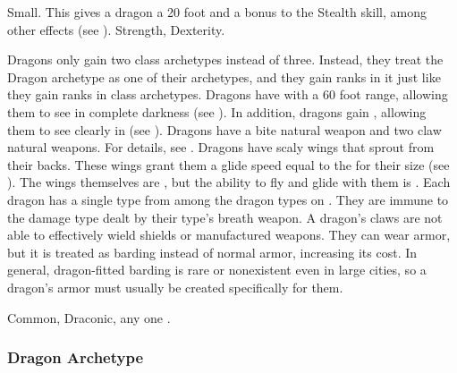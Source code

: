          Small. This gives a dragon a 20 foot  and a  bonus to the Stealth skill, among other effects (see ).
          Strength,  Dexterity.
        \begin{itemize}
             Dragons only gain two class archetypes instead of three.
                Instead, they treat the Dragon archetype as one of their archetypes, and they gain ranks in it just like they gain ranks in class archetypes.
             Dragons have  with a 60 foot range, allowing them to see in complete darkness (see ).
                In addition, dragons gain , allowing them to see clearly in  (see ).
             Dragons have a bite natural weapon and two claw natural weapons.
                For details, see .
             Dragons have scaly wings that sprout from their backs.
                These wings grant them a glide speed equal to the  for their size (see ).
                The wings themselves are , but the ability to fly and glide with them is .
             Each dragon has a single type from among the dragon types on .
                They are immune to the damage type dealt by their type's breath weapon.
             A dragon's claws are not able to effectively wield shields or manufactured weapons.
                They can wear armor, but it is treated as barding instead of normal armor, increasing its cost.
                In general, dragon-fitted barding is rare or nonexistent even in large cities, so a dragon's armor must usually be created specifically for them.
        \end{itemize}
         Common, Draconic, any one .

        \subsubsection{Dragon Archetype}

